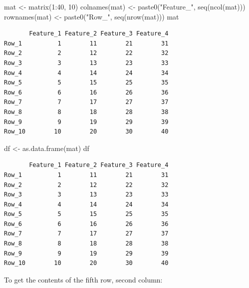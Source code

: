 \documentclass[
]{book}
\newenvironment{Shaded}{\begin{snugshade}}{\end{snugshade}}
\newcommand{\DecValTok}[1]{\textcolor[rgb]{0.00,0.00,0.81}{#1}}
\newcommand{\FunctionTok}[1]{\textcolor[rgb]{0.00,0.00,0.00}{#1}}
\newcommand{\NormalTok}[1]{#1}
\newcommand{\OtherTok}[1]{\textcolor[rgb]{0.56,0.35,0.01}{#1}}
\newcommand{\SpecialCharTok}[1]{\textcolor[rgb]{0.00,0.00,0.00}{#1}}
\newcommand{\StringTok}[1]{\textcolor[rgb]{0.31,0.60,0.02}{#1}}
\begin{document}
\begin{Shaded}
\begin{Highlighting}[]
\NormalTok{mat }\OtherTok{\textless{}{-}} \FunctionTok{matrix}\NormalTok{(}\DecValTok{1}\SpecialCharTok{:}\DecValTok{40}\NormalTok{, }\DecValTok{10}\NormalTok{)}
\FunctionTok{colnames}\NormalTok{(mat) }\OtherTok{\textless{}{-}} \FunctionTok{paste0}\NormalTok{(}\StringTok{"Feature\_"}\NormalTok{, }\FunctionTok{seq}\NormalTok{(}\FunctionTok{ncol}\NormalTok{(mat)))}
\FunctionTok{rownames}\NormalTok{(mat) }\OtherTok{\textless{}{-}} \FunctionTok{paste0}\NormalTok{(}\StringTok{"Row\_"}\NormalTok{, }\FunctionTok{seq}\NormalTok{(}\FunctionTok{nrow}\NormalTok{(mat)))}
\NormalTok{mat}
\end{Highlighting}
\end{Shaded}

\begin{verbatim}
       Feature_1 Feature_2 Feature_3 Feature_4
Row_1          1        11        21        31
Row_2          2        12        22        32
Row_3          3        13        23        33
Row_4          4        14        24        34
Row_5          5        15        25        35
Row_6          6        16        26        36
Row_7          7        17        27        37
Row_8          8        18        28        38
Row_9          9        19        29        39
Row_10        10        20        30        40
\end{verbatim}

\begin{Shaded}
\begin{Highlighting}[]
\NormalTok{df }\OtherTok{\textless{}{-}} \FunctionTok{as.data.frame}\NormalTok{(mat)}
\NormalTok{df}
\end{Highlighting}
\end{Shaded}

\begin{verbatim}
       Feature_1 Feature_2 Feature_3 Feature_4
Row_1          1        11        21        31
Row_2          2        12        22        32
Row_3          3        13        23        33
Row_4          4        14        24        34
Row_5          5        15        25        35
Row_6          6        16        26        36
Row_7          7        17        27        37
Row_8          8        18        28        38
Row_9          9        19        29        39
Row_10        10        20        30        40
\end{verbatim}

To get the contents of the fifth row, second column:
\end{document}
